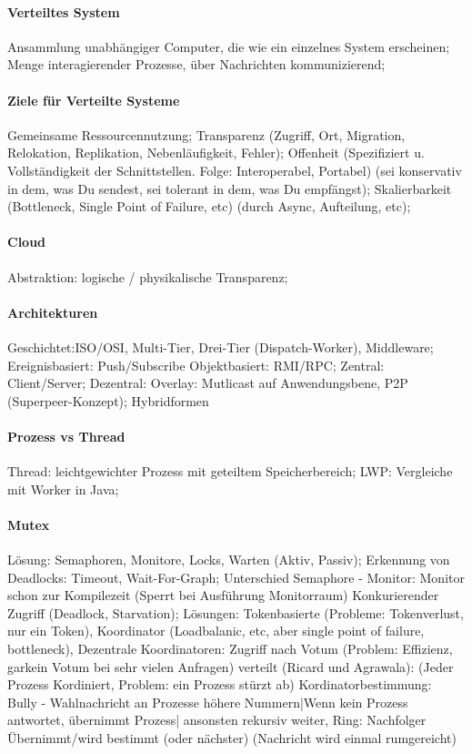 \documentclass[pagesize,11pt,a4paper]{scrartcl}
\begin{document}
\paragraph*{Verteiltes System}
	Ansammlung unabhängiger Computer, die wie ein einzelnes System erscheinen; 
	Menge interagierender Prozesse, über Nachrichten kommunizierend;

\paragraph*{Ziele für Verteilte Systeme}
	Gemeinsame Ressourcennutzung;
	Transparenz (Zugriff, Ort, Migration, Relokation, Replikation, Nebenläufigkeit, Fehler);
	Offenheit (Spezifiziert u. Vollständigkeit der Schnittstellen. Folge: Interoperabel, Portabel) (sei konservativ in dem, was Du sendest, sei tolerant in dem, was Du empfängst);
	Skalierbarkeit (Bottleneck, Single Point of Failure, etc) (durch Async, Aufteilung, etc);
	
\paragraph*{Cloud}
	Abstraktion: logische / physikalische Transparenz; 

\paragraph*{Architekturen}
	Geschichtet:ISO/OSI, Multi-Tier, Drei-Tier (Dispatch-Worker), Middleware;
	Ereignisbasiert: Push/Subscribe
	Objektbasiert: RMI/RPC;
	Zentral: Client/Server;
	Dezentral: Overlay: Mutlicast auf Anwendungsbene, P2P (Superpeer-Konzept);
	Hybridformen
	
\paragraph*{Prozess vs Thread}
	Thread: leichtgewichter Prozess mit geteiltem Speicherbereich;
	LWP: Vergleiche mit Worker in Java;

\paragraph*{Mutex}
	Lösung: Semaphoren, Monitore, Locks, Warten (Aktiv, Passiv);
	Erkennung von Deadlocks: Timeout, Wait-For-Graph;
	Unterschied Semaphore - Monitor: Monitor schon zur Kompilezeit (Sperrt bei Ausführung Monitorraum)
	Konkurierender Zugriff (Deadlock, Starvation);
	Lösungen: 
		Tokenbasierte (Probleme: Tokenverlust, nur ein Token), 
		Koordinator (Loadbalanic, etc, aber single point of failure, bottleneck),
		Dezentrale Koordinatoren: Zugriff nach Votum (Problem: Effizienz, garkein Votum bei sehr vielen Anfragen)
		verteilt (Ricard und Agrawala): (Jeder Prozess Kordiniert, Problem: ein Prozess stürzt ab)  
 		Kordinatorbestimmung: 
			Bully - Wahlnachricht an Prozesse höhere Nummern|Wenn kein Prozess antwortet, übernimmt Prozess| ansonsten rekursiv weiter,
			Ring: Nachfolger Übernimmt/wird bestimmt (oder nächster) (Nachricht wird einmal rumgereicht)
\end{document}
